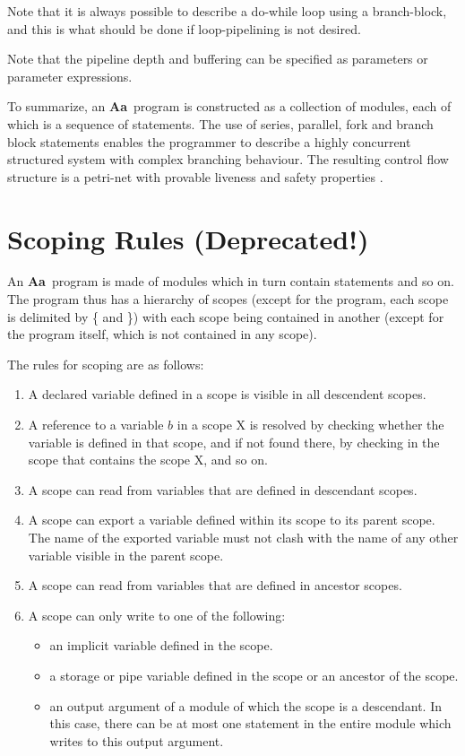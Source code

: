 \documentclass{article}
\newcommand{\Aa}{{\bf Aa}~}
\begin{document}
Note that it is always possible to describe
a do-while loop using a branch-block, and this is what should be done
if loop-pipelining is not desired.

Note that the pipeline depth and buffering can be
specified as parameters or parameter expressions.

To summarize, an \Aa program is constructed as a collection of modules,
each of which is a sequence of statements.  The use of series,
parallel, fork and branch block
statements enables the programmer to describe a highly concurrent
structured system with complex branching behaviour.  
The resulting control flow structure is a
petri-net with provable liveness and safety properties \cite{ref:SameerPhD}.

\section{Scoping Rules (Deprecated!) } \label{sec:Scopes}

An \Aa program is made of modules which in turn contain statements
and so on.  The program thus has a hierarchy of scopes 
(except for the program, each scope is delimited by \{ and \}) with each
scope being contained in another (except for the program itself,
which is not contained in any scope).

The rules for scoping are as follows:
\begin{enumerate}
\item A declared variable defined in a scope is visible
in all descendent scopes. 
\item A reference to a variable $b$ in a scope X is resolved by checking
whether the variable is defined in that scope, and if not found there,
by checking in the scope that contains the scope X, and so on.
\item A scope can read from variables that are defined in descendant
scopes.  
\item A scope can export a variable defined within its scope to
its parent scope.   The name  of the exported variable must not
clash with the name of any other variable visible in the
parent scope.
\item A scope can read from variables that are defined in ancestor scopes.
\item A scope can only write to one of the following:
\begin{itemize}
\item an implicit variable defined in the scope.
\item a storage or pipe variable defined in the scope or an ancestor
of the scope.
\item an output argument of a module of which the scope is a descendant.
In this case, there can be at most one statement in the entire module
which writes to this output argument.
\end{itemize}
\end{enumerate}
\end{document}
